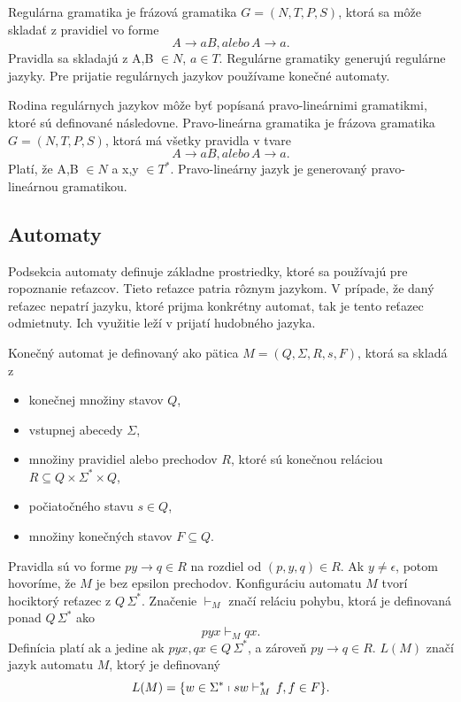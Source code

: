 \begin{definition}
Regulárna gramatika je frázová gramatika $G = (N,T,P,S)$, ktorá sa môže skladať z pravidiel vo forme $$A \rightarrow aB , alebo \, A \rightarrow a.$$ Pravidla sa skladajú z A,B $ \in N$, $a \in T$. Regulárne gramatiky generujú regulárne jazyky. Pre prijatie regulárnych jazykov používame konečné automaty.
\end{definition}

\begin{definition}
\label{def:pravolin}
Rodina regulárnych jazykov môže byť popísaná pravo-lineárnimi gramatikmi, ktoré sú definované následovne. Pravo-lineárna gramatika je frázova gramatika $G = (N,T,P,S)$, ktorá má všetky pravidla v tvare $$A \rightarrow aB, alebo \, A \rightarrow a.$$ Platí, že A,B $ \in N$ a x,y $ \in T^*$. Pravo-lineárny jazyk je generovaný pravo-lineárnou gramatikou.
\end{definition}

\subsection{Automaty}
Podsekcia automaty definuje základne prostriedky, ktoré sa používajú pre ropoznanie reťazcov. Tieto reťazce patria rôznym jazykom. V prípade, že daný reťazec nepatrí jazyku, ktoré prijma konkrétny automat, tak je tento reťazec odmietnuty. Ich využitie leží v prijatí hudobného jazyka.

\begin{definition}
\label{def:endaut}
Konečný automat je definovaný ako pätica $M = (Q,\Sigma,R,s,F)$, ktorá sa skladá z
\begin{itemize}\itemsep0.05em
    \item konečnej množiny stavov $Q$,
    \item vstupnej abecedy $\Sigma$,
    \item množiny pravidiel alebo prechodov $R$, ktoré sú konečnou reláciou $R \subseteq Q \times \Sigma^* \times Q$,
    \item počiatočného stavu $s \in Q$,
    \item množiny konečných stavov $F \subseteq Q$.
\end{itemize}

Pravidla sú vo forme $py \rightarrow q \in R$ na rozdiel od $(p,y,q) \in R$. Ak $y \neq \epsilon$, potom hovoríme, že $M$ je bez epsilon prechodov. Konfiguráciu automatu $M$ tvorí hociktorý reťazec z $Q \, \Sigma^*$. Značenie $\vdash_M$ značí reláciu pohybu, ktorá je definovaná ponad $Q \, \Sigma^*$ ako $$pyx \vdash_M qx.$$ Definícia platí ak a jedine ak $pyx, qx \in Q \, \Sigma^*$, a zároveň $py \rightarrow q \in R$. $L(M)$ značí jazyk automatu $M$, ktorý je  definovaný $$L(M) = \{w \in \Sigma^* \shortmid sw \vdash_M^* \, f, f \in F\}.$$
\end{definition}

